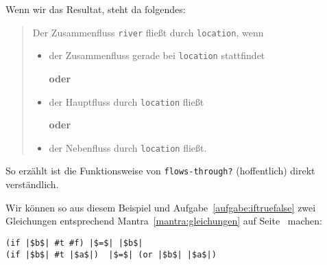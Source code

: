 %
Wenn wir das Resultat, steht da folgendes:
%
\begin{quote}
  Der Zusammenfluss \lstinline{river} fließt durch
  \lstinline{location}, wenn

  \begin{itemize}
  \item der Zusammenfluss gerade bei \lstinline{location} stattfindet

    \centerline{\textbf{oder}}
  \item der Hauptfluss durch \lstinline{location} fließt

    \centerline{\textbf{oder}}
  \item der Nebenfluss durch \lstinline{location} fließt.
  \end{itemize}
\end{quote}
%
So erzählt ist die Funktionsweise von \lstinline{flows-through?}
(hoffentlich) direkt verständlich.

Wir können so aus diesem Beispiel und
Aufgabe~\ref{aufgabe:iftruefalse} zwei Gleichungen entsprechend
Mantra~\ref{mantra:gleichungen} auf Seite~\pageref{mantra:gleichungen}
machen:
%
\begin{lstlisting}
(if |$b$| #t #f) |$=$| |$b$|
(if |$b$| #t |$a$|)  |$=$| (or |$b$| |$a$|)
\end{lstlisting}
%




